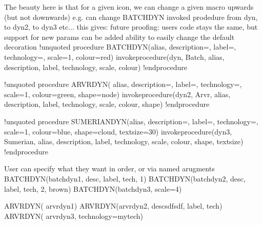 \documentclass[letterpaper,10pt,english]{sphinxmanual}
\begin{document}
\begin{sphinxVerbatim}[commandchars=\\\{\},numbers=left,firstnumber=1,stepnumber=1]
\PYGZsq{} The beauty here is that for a given icon, we can change a given macro upwards (but not downwards)
\PYGZsq{} e.g. can change BATCH\PYGZus{}DYN invoked prodedure from \PYGZdl{}dyn, to \PYGZdl{}dyn2, to \PYGZdl{}dyn3 etc...  this gives: 
\PYGZsq{} future proofing: user\PYGZsq{}s code stays the same, but support for new params can be added
\PYGZsq{} ability to easily change the default decoration 
!unquoted procedure \PYGZdl{}BATCH\PYGZus{}DYN(\PYGZdl{}alias, \PYGZdl{}description=\PYGZdq{}\PYGZdq{}, \PYGZdl{}label=\PYGZdq{}\PYGZdq{}, \PYGZdl{}technology=\PYGZdq{}\PYGZdq{}, \PYGZdl{}scale=1, \PYGZdl{}colour=\PYGZdq{}red\PYGZdq{})
\PYGZpc{}invoke\PYGZus{}procedure(\PYGZdl{}dyn, \PYGZdq{}\PYGZdl{}Batch\PYGZdq{}, \PYGZdl{}alias, \PYGZdl{}description, \PYGZdl{}label, \PYGZdl{}technology, \PYGZdl{}scale, \PYGZdl{}colour)
!endprocedure

!unquoted procedure \PYGZdl{}ARVR\PYGZus{}DYN( \PYGZdl{}alias, \PYGZdl{}description=\PYGZdq{}\PYGZdq{}, \PYGZdl{}label=\PYGZdq{}\PYGZdq{}, \PYGZdl{}technology=\PYGZdq{}\PYGZdq{}, \PYGZdl{}scale=1, \PYGZdl{}colour=\PYGZdq{}green\PYGZdq{}, \PYGZdl{}shape=\PYGZdq{}node\PYGZdq{})
\PYGZpc{}invoke\PYGZus{}procedure(\PYGZdl{}dyn2, \PYGZdq{}\PYGZdl{}Arvr\PYGZdq{}, \PYGZdl{}alias, \PYGZdl{}description, \PYGZdl{}label, \PYGZdl{}technology, \PYGZdl{}scale, \PYGZdl{}colour, \PYGZdl{}shape)
!endprocedure

!unquoted procedure \PYGZdl{}SUMERIAN\PYGZus{}DYN(\PYGZdl{}alias, \PYGZdl{}description=\PYGZdq{}\PYGZdq{}, \PYGZdl{}label=\PYGZdq{}\PYGZdq{}, \PYGZdl{}technology=\PYGZdq{}\PYGZdq{}, \PYGZdl{}scale=1, \PYGZdl{}colour=\PYGZdq{}blue\PYGZdq{}, \PYGZdl{}shape=\PYGZdq{}cloud\PYGZdq{}, \PYGZdl{}textsize=\PYGZdq{}30\PYGZdq{})
\PYGZpc{}invoke\PYGZus{}procedure(\PYGZdl{}dyn3, \PYGZdq{}\PYGZdl{}Sumerian\PYGZdq{}, \PYGZdl{}alias, \PYGZdl{}description, \PYGZdl{}label, \PYGZdl{}technology, \PYGZdl{}scale, \PYGZdl{}colour, \PYGZdl{}shape, \PYGZdl{}textsize)
!endprocedure


\PYGZsq{} User can specify what they want in order, or via named arugments
\PYGZdl{}BATCH\PYGZus{}DYN(\PYGZdq{}batch\PYGZus{}dyn\PYGZus{}1\PYGZdq{}, \PYGZdq{}desc\PYGZdq{}, \PYGZdq{}label\PYGZdq{}, \PYGZdq{}tech\PYGZdq{}, 1)
\PYGZdl{}BATCH\PYGZus{}DYN(\PYGZdq{}batch\PYGZus{}dyn\PYGZus{}2\PYGZdq{}, \PYGZdq{}desc\PYGZdq{}, \PYGZdq{}label\PYGZdq{}, \PYGZdq{}tech\PYGZdq{}, 2, \PYGZdq{}brown\PYGZdq{})
\PYGZdl{}BATCH\PYGZus{}DYN(\PYGZdq{}batch\PYGZus{}dyn\PYGZus{}3\PYGZdq{}, \PYGZdl{}scale=4)

\PYGZdl{}ARVR\PYGZus{}DYN( \PYGZdq{}arvr\PYGZus{}dyn\PYGZus{}1\PYGZdq{})
\PYGZdl{}ARVR\PYGZus{}DYN(\PYGZdq{}arvr\PYGZus{}dyn\PYGZus{}2\PYGZdq{}, \PYGZdq{}descsdfsdf\PYGZdq{}, \PYGZdq{}label\PYGZdq{}, \PYGZdq{}tech\PYGZdq{})
\PYGZdl{}ARVR\PYGZus{}DYN( \PYGZdq{}arvr\PYGZus{}dyn\PYGZus{}3\PYGZdq{}, \PYGZdl{}technology=\PYGZdq{}mytech\PYGZdq{})



\end{sphinxVerbatim}
\end{document}
